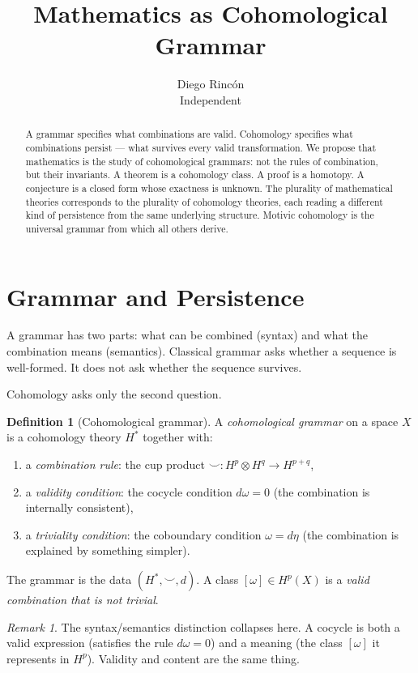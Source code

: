\documentclass[12pt]{article}
\title{Mathematics as Cohomological Grammar}
\author{Diego Rinc\'on\\
\small Independent}
\date{}
\theoremstyle{definition}
\newtheorem{definition}[theorem]{Definition}
\theoremstyle{remark}
\newtheorem{remark}[theorem]{Remark}
\begin{document}
\maketitle

\begin{abstract}
A grammar specifies what combinations are valid.
Cohomology specifies what combinations persist ---
what survives every valid transformation.
We propose that mathematics is the study of cohomological grammars:
not the rules of combination, but their invariants.
A theorem is a cohomology class.
A proof is a homotopy.
A conjecture is a closed form whose exactness is unknown.
The plurality of mathematical theories corresponds to the plurality
of cohomology theories, each reading a different kind of persistence
from the same underlying structure.
Motivic cohomology is the universal grammar from which all others derive.
\end{abstract}

\section{Grammar and Persistence}

A grammar has two parts: what can be combined (syntax) and what the
combination means (semantics). Classical grammar asks whether a sequence
is well-formed. It does not ask whether the sequence survives.

Cohomology asks only the second question.

\begin{definition}[Cohomological grammar]
A \emph{cohomological grammar} on a space $X$ is a cohomology theory
$H^*$ together with:
\begin{enumerate}
\item a \emph{combination rule}: the cup product
  $\smile: H^p \otimes H^q \to H^{p+q}$,
\item a \emph{validity condition}: the cocycle condition $d\omega = 0$
  (the combination is internally consistent),
\item a \emph{triviality condition}: the coboundary condition
  $\omega = d\eta$ (the combination is explained by something simpler).
\end{enumerate}
The grammar is the data $(H^*, \smile, d)$.
A class $[\omega] \in H^p(X)$ is a \emph{valid combination that is not trivial}.
\end{definition}

\begin{remark}
The syntax/semantics distinction collapses here.
A cocycle is both a valid expression (satisfies the rule $d\omega = 0$)
and a meaning (the class $[\omega]$ it represents in $H^p$).
Validity and content are the same thing.
\end{remark}
\end{document}
